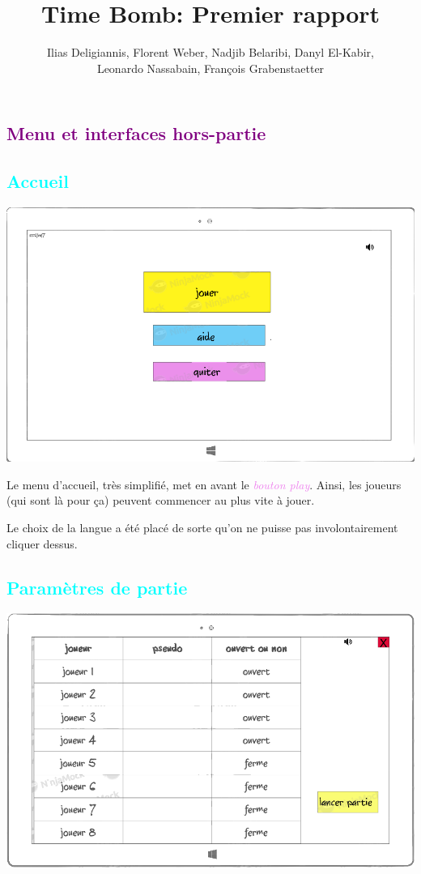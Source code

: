 \documentclass[a4paper]{article}
\title{Time Bomb: Premier rapport}
\author{Ilias Deligiannis, Florent Weber, Nadjib Belaribi, Danyl El-Kabir,\\
Leonardo Nassabain, François Grabenstaetter}
\let\oldsection\section
\renewcommand{\section}[1]{\textcolor{purple}{\oldsection{#1}}}
\let\oldsubsection\subsection
\renewcommand{\subsection}[1]{\textcolor{cyan}{\oldsubsection{#1}}}
\let\oldtextit\textit
\renewcommand{\textit}[1]{\textcolor{violet}{\oldtextit{#1}}}
\begin{document}
\sffamily
\everymath{\displaystyle}
\setlength\parindent{0mm}
\setlength{\parskip}{0.2cm}
\maketitle

\section{Menu et interfaces hors-partie}

\subsection{Accueil}

\begin{center}
    \includegraphics[scale=2]{img/accueil.png}
\end{center}

Le menu d'accueil, très simplifié, met en avant le \textit{bouton play}. Ainsi, les joueurs (qui sont là pour ça) peuvent commencer au plus vite à jouer.

Le choix de la langue a été placé de sorte qu'on ne puisse pas involontairement cliquer dessus.

\newpage
\subsection{Paramètres de partie}

\begin{center}
    \includegraphics[scale=2]{img/param_partie.png}
\end{center}
\end{document}
